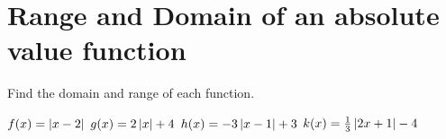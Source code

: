 \section*{Range and Domain of an absolute value function}
Find the domain and range of each function.
\begin{smenum}
\mitemxx
{$f(x)=\left|x-2\right|$}
{$g(x)=2\left|x\right|+4$}
\mitemxx
{$h(x)=-3\left|x-1\right|+3$}
{$k(x)=\frac{1}{3}\left|2x+1\right|-4$}
\end{smenum}

%


